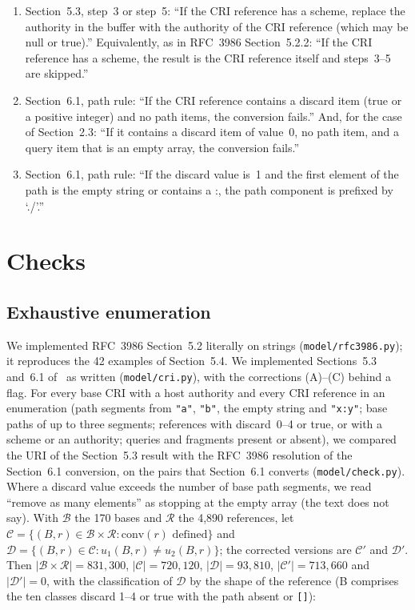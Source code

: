 \documentclass[11pt,a4paper]{article}
\theoremstyle{remark}
\newcommand{\lean}[1]{\texttt{#1}}
\newcommand{\cri}[1]{\texttt{#1}}
\newcommand{\conv}{\mathrm{conv}}
\begin{document}
\begin{enumerate}[label=\textbf{(\Alph*)},leftmargin=*]
\item Section~5.3, step~3 or step~5: ``If the CRI reference has a scheme, replace the authority in the
buffer with the authority of the CRI reference (which may be null or true).'' Equivalently, as in
RFC~3986 Section~5.2.2: ``If the CRI reference has a scheme, the result is the CRI reference itself and
steps~3--5 are skipped.''
\item Section~6.1, path rule: ``If the CRI reference contains a discard item (true or a positive
integer) and no path items, the conversion fails.'' And, for the case of Section~2.3: ``If it contains a
discard item of value~0, no path item, and a query item that is an empty array, the conversion fails.''
\item Section~6.1, path rule: ``If the discard value is~1 and the first element of the path is the empty
string or contains a :, the path component is prefixed by `./'.''
\end{enumerate}

\section{Checks}
\label{sec:checks}

\subsection{Exhaustive enumeration}
We implemented RFC~3986 Section~5.2 literally on strings (\lean{model/rfc3986.py}); it reproduces the
42 examples of Section~5.4. We implemented Sections~5.3 and~6.1 of~\cite{href} as written
(\lean{model/cri.py}), with the corrections (A)--(C) behind a flag. For every base CRI with a host
authority and every CRI reference in an enumeration (path segments from \cri{"a"}, \cri{"b"}, the empty
string and \cri{"x:y"}; base paths of up to three segments; references with discard~0--4 or true, or
with a scheme or an authority; queries and fragments present or absent), we compared the URI of the
Section~5.3 result with the RFC~3986 resolution of the Section~6.1 conversion, on the pairs that
Section~6.1 converts (\lean{model/check.py}). Where a discard value exceeds the number of base path
segments, we read ``remove as many elements'' as stopping at the empty array (the text does not say).
With $\mathcal{B}$ the 170 bases and $\mathcal{R}$ the 4{,}890 references, let
$\mathcal{C}=\{(B,r)\in\mathcal{B}\times\mathcal{R}:\conv(r)\text{ defined}\}$ and
$\mathcal{D}=\{(B,r)\in\mathcal{C}:u_1(B,r)\neq u_2(B,r)\}$; the corrected versions are
$\mathcal{C}'$ and $\mathcal{D}'$. Then $|\mathcal{B}\times\mathcal{R}|=831{,}300$,
$|\mathcal{C}|=720{,}120$, $|\mathcal{D}|=93{,}810$, $|\mathcal{C}'|=713{,}660$ and $|\mathcal{D}'|=0$,
with the classification of $\mathcal{D}$ by the shape of the reference (B comprises the ten classes
discard 1--4 or true with the path absent or \cri{[]}):
\end{document}
